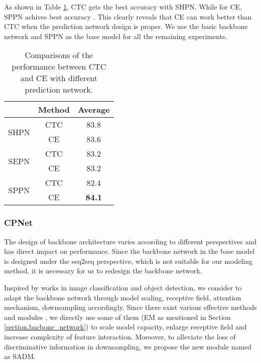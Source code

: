 \documentclass[final]{cvpr}
\begin{document}
As shown in Table \ref{table.CTC_vs_CE}, CTC gets the best accuracy  with SHPN. While for CE, SPPN achives best accuracy . This clearly reveals that CE can work better than CTC when the prediction network design is proper. 
We use the basic backbone network and SPPN as the base model for all the remaining experiments.


\begin{table}[htb]
	\centering
    \caption{Comparisons of the performance between CTC and CE with different prediction network.}
    \label{table.CTC_vs_CE}
    	\begin{tabular}{ | c | c | c |}
    		\hline
    		 	& Method & Average \\ 
    		\hline
    		\multirow{2}{*}{SHPN}
    		    & CTC & 83.8 \\ 
    		    & CE & 83.6 \\ 
    		\hline
    		\multirow{2}{*}{SEPN}
    		    & CTC & 83.2 \\ 
    		    & CE & 83.2 \\ 
    		\hline 
    		\multirow{2}{*}{SPPN}
    		    & CTC & 82.4 \\ 
    		    & CE & \textbf{84.1} \\ 
    		\hline
    	\end{tabular}
	
\end{table}

\subsubsection{CPNet}
The design of backbone architecture varies according to different perspectives and has direct impact on performance. Since the backbone network in the base model is designed under the seq2seq perspective, which is not suitable for our modeling method, it is necessary for us to redesign the backbone network. 

Inspired by works in image classification and object detection, we consider to adapt the backbone network through model scaling, receptive field, attention mechanism, downsampling accordingly. Since there exist various effective methods and modules \cite{tan2019efficientnet,woo2018cbam,lin2017feature}, we directly use some of them (EM as mentioned in Section \ref{section.bacbone_network}) to scale model capacity, enlarge receptive field and increase complexity of feature interaction.
Moreover, to alleviate the loss of discriminative information in downsampling, we propose the new module named as SADM. 
\end{document}
